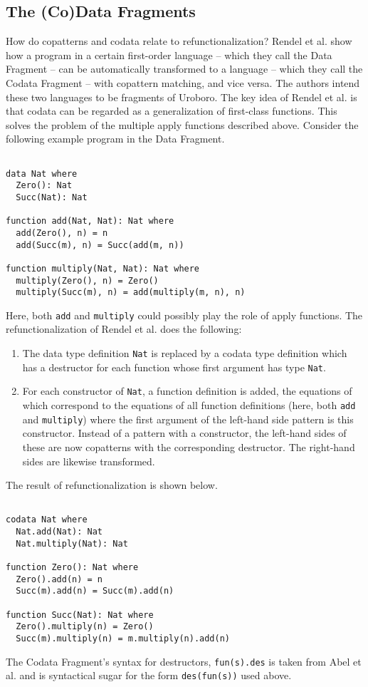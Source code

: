 \subsection{The (Co)Data Fragments}
\label{ssec:urocdf}

How do copatterns and codata relate to refunctionalization? Rendel et al. show how a program in a certain first-order language -- which they call the Data Fragment -- can be automatically transformed to a language -- which they call the Codata Fragment -- with copattern matching, and vice versa. The authors intend these two languages to be fragments of Uroboro. The key idea of Rendel et al. is that codata can be regarded as a generalization of first-class functions. This solves the problem of the multiple apply functions described above. Consider the following example program in the Data Fragment.

\begin{lstlisting}

data Nat where
  Zero(): Nat
  Succ(Nat): Nat

function add(Nat, Nat): Nat where
  add(Zero(), n) = n
  add(Succ(m), n) = Succ(add(m, n))

function multiply(Nat, Nat): Nat where
  multiply(Zero(), n) = Zero()
  multiply(Succ(m), n) = add(multiply(m, n), n)

\end{lstlisting}

Here, both \texttt{add} and \texttt{multiply} could possibly play the role of apply functions. The refunctionalization of Rendel et al. does the following:
\begin{enumerate}
\item The data type definition \texttt{Nat} is replaced by a codata type definition which has a destructor for each function whose first argument has type \texttt{Nat}.
\item For each constructor of \texttt{Nat}, a function definition is added, the equations of which correspond to the equations of all function definitions (here, both \texttt{add} and \texttt{multiply}) where the first argument of the left-hand side pattern is this constructor. Instead of a pattern with a constructor, the left-hand sides of these are now copatterns with the corresponding destructor. The right-hand sides are likewise transformed.
\end{enumerate}
The result of refunctionalization is shown below.

\begin{lstlisting}

codata Nat where
  Nat.add(Nat): Nat
  Nat.multiply(Nat): Nat

function Zero(): Nat where
  Zero().add(n) = n
  Succ(m).add(n) = Succ(m).add(n)

function Succ(Nat): Nat where
  Zero().multiply(n) = Zero()
  Succ(m).multiply(n) = m.multiply(n).add(n)

\end{lstlisting}
The Codata Fragment's syntax for destructors, \texttt{fun(s).des} is taken from Abel et al. and is syntactical sugar for the form \texttt{des(fun(s))} used above.

